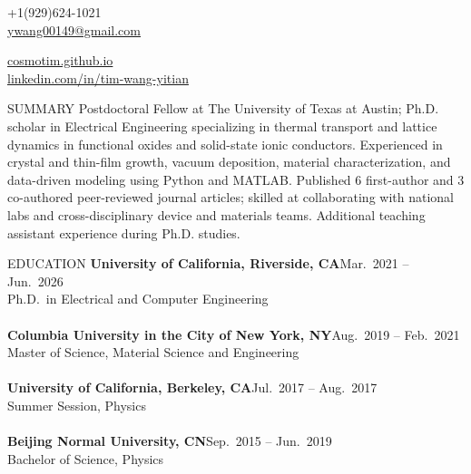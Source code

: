 \documentclass{resume} %
\begin{document}
\vspace{-1em}
\noindent
\begin{minipage}[t]{0.5\textwidth}
\raggedright
+1(929)624-1021 \\
\href{mailto:ywang00149@gmail.com}{ywang00149@gmail.com}
\end{minipage}%
\begin{minipage}[t]{0.5\textwidth}
\raggedleft
\href{http://cosmotim.github.io}{cosmotim.github.io} \\
\href{http://linkedin.com/in/tim-wang-yitian/}{linkedin.com/in/tim-wang-yitian}
\end{minipage}
\vspace{0.5em}


\begin{rSection}{SUMMARY}
Postdoctoral Fellow at The University of Texas at Austin; Ph.D. scholar in Electrical Engineering specializing in thermal transport and lattice dynamics in functional oxides and solid-state ionic conductors.
Experienced in crystal and thin-film growth, vacuum deposition, material characterization, and data-driven modeling using Python and MATLAB.
Published 6 first-author and 3 co-authored peer-reviewed journal articles; skilled at collaborating with national labs and cross-disciplinary device and materials teams.
Additional teaching assistant experience during Ph.D. studies.
\end{rSection}


\begin{rSection}{EDUCATION}
{\bf University of California, Riverside, CA}\hfill{Mar.\ 2021 -- Jun.\ 2026}
\\ Ph.D.\ in Electrical and Computer Engineering
\\
\\{\bf Columbia University in the City of New York, NY}\hfill{Aug.\ 2019 -- Feb.\ 2021}
\\ Master of Science, Material Science and Engineering
\\
\\{\bf University of California, Berkeley, CA}\hfill{Jul.\ 2017 -- Aug.\ 2017}
\\ Summer Session, Physics
\\
\\{\bf Beijing Normal University, CN}\hfill{Sep.\ 2015 -- Jun.\ 2019}
\\ Bachelor of Science, Physics

\end{rSection}
\end{document}
